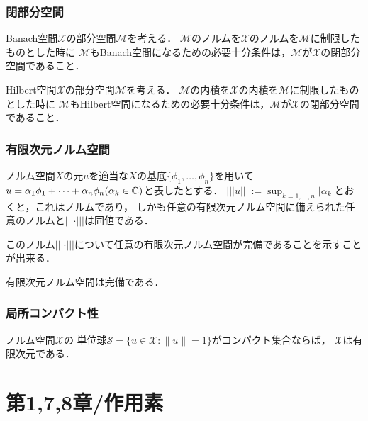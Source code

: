 \documentclass[a4j]{jsarticle}
\newcommand{\spX}{\mathscr{X}}
\begin{document}
    \subsubsection{閉部分空間}
    \begin{Them}[定理1.28, p17] \label{them1:28}
        Banach空間$\spX$の部分空間$\mathscr{M}$を考える．
        $\mathscr{M}$のノルムを$\spX$のノルムを$\mathscr{M}$に制限したものとした時に
        $\mathscr{M}$もBanach空間になるための必要十分条件は，$\mathscr{M}$が$\spX$の閉部分空間であること．
    \end{Them}
    \begin{Cor}[系1.29, p.18] \label{cor1:29}
        Hilbert空間$\spX$の部分空間$\mathscr{M}$を考える．
        $\mathscr{M}$の内積を$\spX$の内積を$\mathscr{M}$に制限したものとした時に
        $\mathscr{M}$もHilbert空間になるための必要十分条件は，$\mathscr{M}$が$\spX$の閉部分空間であること．
    \end{Cor}

    \subsubsection{有限次元ノルム空間}
    \begin{Them}[補題1.38, p.22] \label{them1:38}
        ノルム空間$X$の元$u$を適当な$X$の基底$\{ \phi_1, \dots, \phi_n \}$を用いて
        $u=\alpha_1 \phi_1+\dots+\alpha_n \phi_n (\alpha_k \in \mathbb{C})$と表したとする．
        $||| u |||:=\sup_{k=1,\dots,n}{|\alpha_k|}$とおくと，これはノルムであり，
        しかも任意の有限次元ノルム空間に備えられた任意のノルムと$||| \cdot |||$は同値である．
    \end{Them}
    このノルム$||| \cdot |||$について任意の有限次元ノルム空間が完備であることを示すことが出来る．
    \begin{Them}[定理1.37, p.22] \label{them1:37}
        有限次元ノルム空間は完備である．
    \end{Them}

    \subsubsection{局所コンパクト性}
    \begin{Them}
        ノルム空間$\spX$の
        単位球$\mathcal{S}=\{u \in \spX : \|u\|=1\}$がコンパクト集合ならば，
        $\spX$は有限次元である．
    \end{Them}

    \section{第1,7,8章/作用素}
\end{document}
